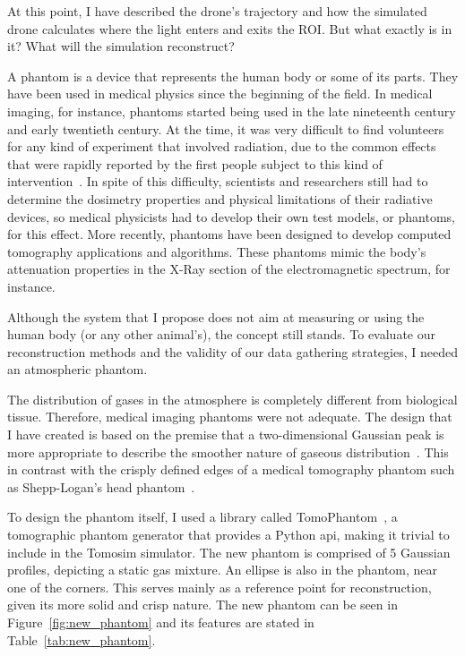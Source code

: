 At this point, I have described the drone's trajectory and how the
simulated drone calculates where the light enters and exits the
\gls{ROI}. But what exactly is in it? What will the simulation
reconstruct?  

A phantom is a device that represents the human body or some of its
parts. They have been used in medical physics since the beginning of the
field. In medical imaging, for instance, phantoms started being used in
the late nineteenth century and early twentieth century. At the time, it
was very difficult to find volunteers for any kind of experiment that
involved radiation, due to the common effects that were rapidly reported
by the first people subject to this kind of
intervention~\cite{Dewerd2014}. In spite of this difficulty, scientists
and researchers still had to determine the dosimetry properties and
physical limitations of their radiative devices, so medical physicists
had to develop their own test models, or phantoms, for this effect. More
recently, phantoms have been designed to develop computed tomography
applications and algorithms. These phantoms mimic the body's attenuation
properties in the X-Ray section of the electromagnetic spectrum, for
instance.

Although the system that I propose does not aim at measuring or using
the human body (or any other animal's), the concept still stands. To
evaluate our reconstruction methods and the validity of our data
gathering strategies, I needed an atmospheric phantom.

The distribution of gases in the atmosphere is completely different from
biological tissue. Therefore, medical imaging phantoms were not
adequate. The design that I have created is based on the premise that a
two-dimensional Gaussian peak is more appropriate to describe the
smoother nature of gaseous distribution~\cite{Stachniss2009}. This in
contrast with the crisply defined edges of a medical tomography phantom
such as Shepp-Logan's head phantom~\cite{Shepp1974}.

To design the phantom itself, I used a library called
TomoPhantom~\cite{Kazantsev2018}, a tomographic phantom generator that
provides a Python \gls{api}, making it trivial to include in the Tomosim
simulator. The new phantom is comprised of 5 Gaussian profiles,
depicting a static gas mixture. An ellipse is also in the phantom, near
one of the corners. This serves mainly as a reference point for
reconstruction, given its more solid and crisp nature. The new phantom
can be seen in Figure~\ref{fig:new_phantom} and its features are stated
in Table~\ref{tab:new_phantom}.

